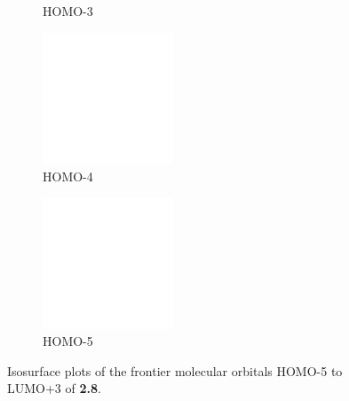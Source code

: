 \begin{figure}[!ht]
\begin{subfigure}[b]{0.31\textwidth}
  \caption{HOMO-3}
 \end{subfigure}
 \begin{subfigure}[b]{0.31\textwidth}
  \includegraphics[clip=true, width=\textwidth, height=39mm, keepaspectratio]{images/mos/8h-4.eps}
  \caption{HOMO-4}
 \end{subfigure}
 \begin{subfigure}[b]{0.31\textwidth}
  \includegraphics[clip=true, width=\textwidth, height=39mm, keepaspectratio]{images/mos/8h-5.eps}
  \caption{HOMO-5}
 \end{subfigure}
\caption[Molecular orbitals HOMO-5 to LUMO+3 of \textbf{2.8}.]{Isosurface plots of the frontier molecular orbitals HOMO-5 to LUMO+3 of \textbf{2.8}.}
\label{fig.mo28}
\end{figure}
